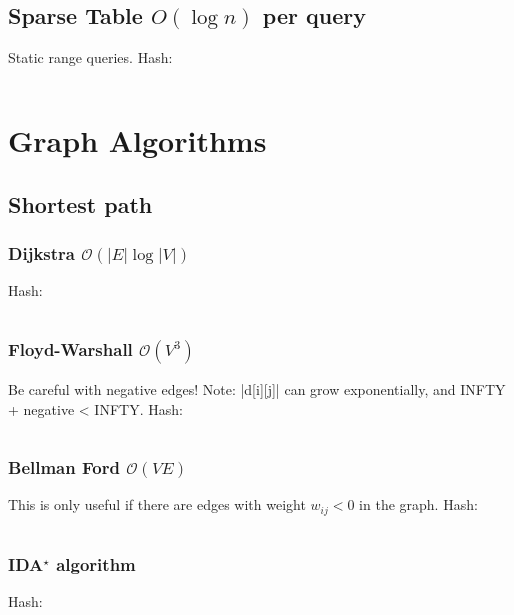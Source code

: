\documentclass[9pt,a4paper,landscape,oneside]{amsart}
\newcommand{\mintedstyle}[2]{\inputminted{#1}{code/#2}}
\newcommand{\code}[1]{ Hash: 
\mintedstyle{cpp}{#1}}
\begin{document}
\begin{multicols*}{3}

\subsection{Sparse Table $O(\log n)$ per query} Static range queries.
\code{datastructures/sparse_table.cpp}

\section{Graph Algorithms}

\subsection{Shortest path}

\subsubsection{Dijkstra $\mathcal{O}(|E|\log{|V|})$}
\code{graphs/dijkstra.cpp}

\subsubsection{Floyd-Warshall $\mathcal{O}(V^{3})$}
Be careful with negative edges! Note: |d[i][j]| can grow exponentially, and INFTY + negative < INFTY.
\code{graphs/floydwarshall.cpp}

\subsubsection{Bellman Ford $\mathcal{O}(V E)$}
This is only useful if there are edges with weight $w_{i j} < 0$ in the graph.
\code{graphs/bellmanford.cpp}

\subsubsection{IDA$^\star$ algorithm}
\code{graphs/idastar.cpp}


\end{multicols*}
\end{document}

